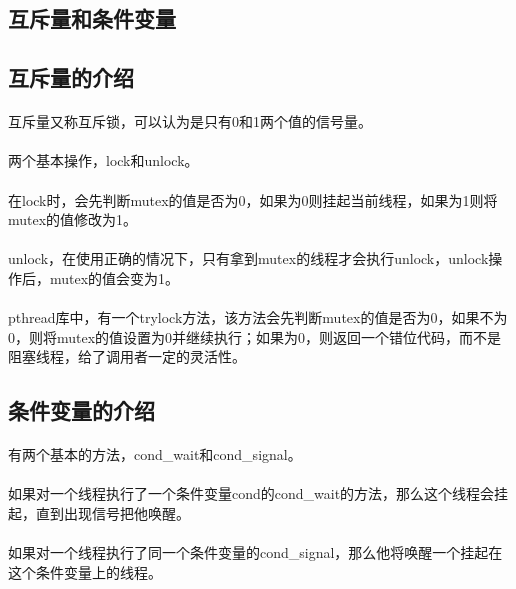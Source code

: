 \documentclass[12pt]{article}
\begin{document}
\begin{CJK}{UTF8}{gbsn}
\subsection{互斥量和条件变量}
\subsection{互斥量的介绍}
\paragraph{}互斥量又称互斥锁，可以认为是只有0和1两个值的信号量。
\paragraph{}两个基本操作，lock和unlock。
\paragraph{}在lock时，会先判断mutex的值是否为0，如果为0则挂起当前线程，如果为1则将mutex的值修改为1。
\paragraph{}unlock，在使用正确的情况下，只有拿到mutex的线程才会执行unlock，unlock操作后，mutex的值会变为1。
\paragraph{}pthread库中，有一个trylock方法，该方法会先判断mutex的值是否为0，如果不为0，则将mutex的值设置为0并继续执行；如果为0，则返回一个错位代码，而不是阻塞线程，给了调用者一定的灵活性。
\subsection{条件变量的介绍}
\paragraph{}有两个基本的方法，cond\_wait和cond\_signal。
\paragraph{}如果对一个线程执行了一个条件变量cond的cond\_wait的方法，那么这个线程会挂起，直到出现信号把他唤醒。
\paragraph{}如果对一个线程执行了同一个条件变量的cond\_signal，那么他将唤醒一个挂起在这个条件变量上的线程。

\end{CJK}
\end{document}
